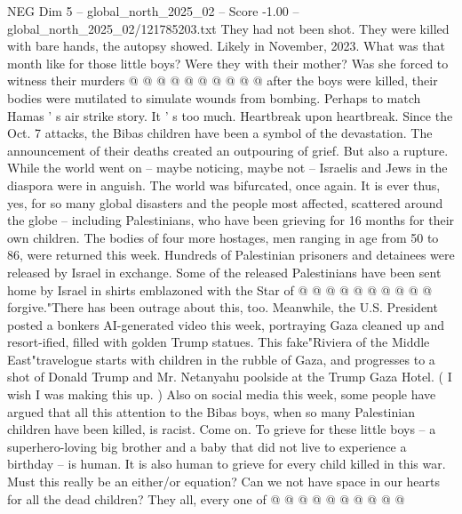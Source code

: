 \begin{textsample}{NEG Dim 5 – global\_north\_2025\_02 – Score -1.00 – global\_north\_2025\_02/121785203.txt}
They had not been shot.
They were killed with bare hands, the autopsy showed.
Likely in November, 2023.
What was that month like for those little boys?
Were they with their mother?
Was she forced to witness their murders @ @ @ @ @ @ @ @ @ @ after the boys were killed, their bodies were mutilated to simulate wounds from bombing.
Perhaps to match Hamas ' s air strike story.
It ' s too much.
Heartbreak upon heartbreak.
Since the Oct. 7 attacks, the Bibas children have been a symbol of the devastation.
The announcement of their deaths created an outpouring of grief.
But also a rupture.
While the world went on -- maybe noticing, maybe not -- Israelis and Jews in the diaspora were in anguish.
The world was bifurcated, once again.
It is ever thus, yes, for so many global disasters and the people most affected, scattered around the globe -- including Palestinians, who have been grieving for 16 months for their own children.
The bodies of four more hostages, men ranging in age from 50 to 86, were returned this week.
Hundreds of Palestinian prisoners and detainees were released by Israel in exchange.
Some of the released Palestinians have been sent home by Israel in shirts emblazoned with the Star of @ @ @ @ @ @ @ @ @ @ forgive."There has been outrage about this, too.
Meanwhile, the U.S.
President posted a bonkers AI-generated video this week, portraying Gaza cleaned up and resort-ified, filled with golden Trump statues.
This fake"Riviera of the Middle East"travelogue starts with children in the rubble of Gaza, and progresses to a shot of Donald Trump and Mr.
Netanyahu poolside at the Trump Gaza Hotel. ( I wish I was making this up. ) Also on social media this week, some people have argued that all this attention to the Bibas boys, when so many Palestinian children have been killed, is racist.
Come on.
To grieve for these little boys -- a superhero-loving big brother and a baby that did not live to experience a birthday -- is human.
It is also human to grieve for every child killed in this war.
Must this really be an either/or equation?
Can we not have space in our hearts for all the dead children?
They all, every one of @ @ @ @ @ @ @ @ @ @

\end{textsample}
